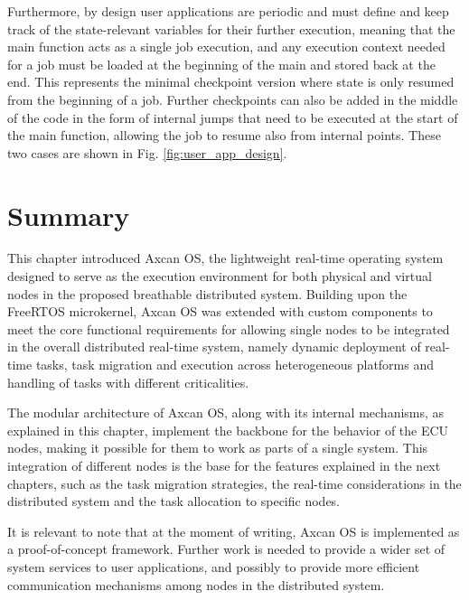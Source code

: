 Furthermore, by design user applications are periodic and must define and keep track of the state-relevant variables for their further execution, meaning that the main function acts as a single job execution, and any execution context needed for a job must be loaded at the beginning of the main and stored back at the end. This represents the minimal checkpoint version where state is only resumed from the beginning of a job. Further checkpoints can also be added in the middle of the code in the form of internal jumps that need to be executed at the start of the main function, allowing the job to resume also from internal points. These two cases are shown in Fig. \ref{fig:user_app_design}.

\section{Summary}

This chapter introduced Axcan OS, the lightweight real-time operating system designed to serve as the execution environment for both physical and virtual nodes in the proposed breathable distributed system. Building upon the FreeRTOS microkernel, Axcan OS was extended with custom components to meet the core functional requirements for allowing single nodes to be integrated in the overall distributed real-time system, namely dynamic deployment of real-time tasks, task migration and execution across heterogeneous platforms and handling of tasks with different criticalities.

The modular architecture of Axcan OS, along with its internal mechanisms, as explained in this chapter, implement the backbone for the behavior of the ECU nodes, making it possible for them to work as parts of a single system. This integration of different nodes is the base for the features explained in the next chapters, such as the task migration strategies, the real-time considerations in the distributed system and the task allocation to specific nodes.

It is relevant to note that at the moment of writing, Axcan OS is implemented as a proof-of-concept framework. Further work is needed to provide a wider set of system services to user applications, and possibly to provide more efficient communication mechanisms among nodes in the distributed system.

